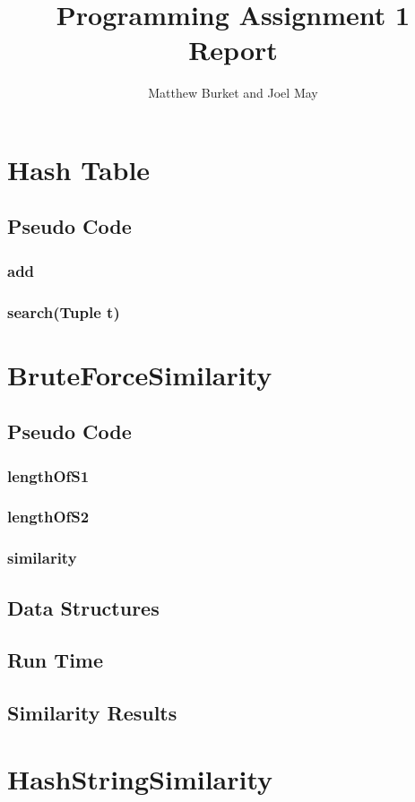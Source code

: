 \documentclass[10pt,letterpaper]{article}
\author{Matthew Burket and Joel May}
\title{Programming Assignment 1 Report}
\begin{document}
\maketitle
\section{Hash Table}
\subsection{Pseudo Code} 
\subsubsection{add}
\subsubsection{search(Tuple t)}
\section{BruteForceSimilarity}
\subsection{Pseudo Code}
\subsubsection{lengthOfS1}
\subsubsection{lengthOfS2}
\subsubsection{similarity}
\subsection{Data Structures }
\subsection{Run Time}
\subsection{Similarity Results}
\section{HashStringSimilarity}
\end{document}
